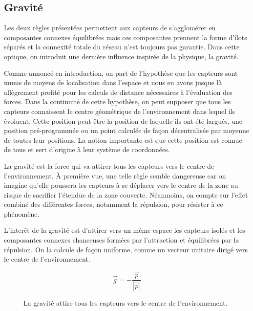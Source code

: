 \documentclass[10pt]{article}
\begin{document}
\begin{multicols}{2}
\subsection*{Gravité}

Les deux règles présentées permettent aux capteurs de s'agglomérer en
composantes connexes équilibrées mais ces composantes prennent la
forme d'îlots séparés et la connexité totale du réseau n'est toujours
pas garantie. Dans cette optique, on introduit une dernière influence
inspirée de la physique, la gravité.

Comme annoncé en introduction, on part de l'hypothèse que les capteurs
sont munis de moyens de localisation dans l'espace et nous en avons
jusque là allègrement profité pour les calculs de distance nécessaires
à l'évaluation des forces. Dans la continuité de cette hypothèse, on
peut supposer que tous les capteurs connaissent le centre géométrique
de l'environnement dans lequel ils évoluent. Cette position peut être
la position de laquelle ils ont été largués, une position
pré-programmée ou un point calculée de façon décentralisée par moyenne
de toutes leur positions. La notion importante est que cette position
est connue de tous et sert d'origine à leur système de coordonnées.

La gravité est la force qui va attirer tous les capteurs vers le
centre de l'environnement. \`A première vue, une telle règle semble
dangereuse car on imagine qu'elle poussera les capteurs à se déplacer
vers le centre de la zone au risque de sacrifier l'étendue de la zone
couverte. Néanmoins, on compte sur l'effet combiné des différentes
forces, notamment la répulsion, pour résister à ce phénomène.

L'interêt de la gravité est d'attirer vers un même espace les capteurs
isolés et les composantes connexes chanceuses formées par l'attraction
et équilibrées par la répulsion. On la calcule de façon uniforme,
comme un vecteur unitaire dirigé vers le centre de l'environnement.

$$
\vec{g} = -\frac{\vec{p}}{|\vec{p}|}
$$

\begin{figure}[H]

  \centering

  

  \caption{La gravité attire tous les capteurs vers le centre de
    l'environnement.}
  \label{gravite}

\end{figure}


\end{multicols}
\end{document}
